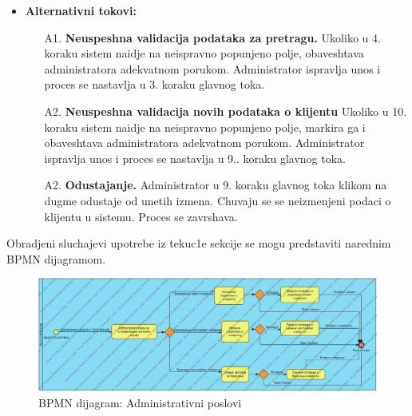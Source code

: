 \begin{itemize}
{}
\item{\textbf{Alternativni tokovi:} 
\begin{enumerate}
    \item [A1.] \textbf{Neuspeshna validacija podataka za pretragu.} Ukoliko u 4. koraku sistem naidje na neispravno popunjeno polje, obaveshtava administratora adekvatnom porukom. Administrator ispravlja unos i proces se nastavlja u 3. koraku glavnog toka.
    \item [A2.] \textbf{Neuspeshna validacija novih podataka o klijentu} Ukoliko u 10. koraku sistem naidje na neispravno popunjeno polje, markira ga i obaveshtava administratora adekvatnom porukom. Administrator ispravlja unos i proces se nastavlja u 9.. koraku glavnog toka.
    \item[A2.] \textbf{Odustajanje.} Administrator u 9. koraku glavnog toka klikom na dugme odustaje od unetih izmena. Chuvaju se se neizmenjeni podaci o klijentu u sistemu. Proces se zavrshava.
\end{enumerate}
}
\end{itemize}

Obradjeni sluchajevi upotrebe iz tekuc1e sekcije se mogu predstaviti narednim BPMN dijagramom.
\newpage

\begin{figure}[ht!]
    \includegraphics[angle = 90, scale = 0.35]{Slike/BPMN/BPMNadministrativniPoslovi.jpg}
    \centering
    \caption{BPMN dijagram: Administrativni poslovi}
    \label{BPMN administrativni poslovi}
\end{figure}  